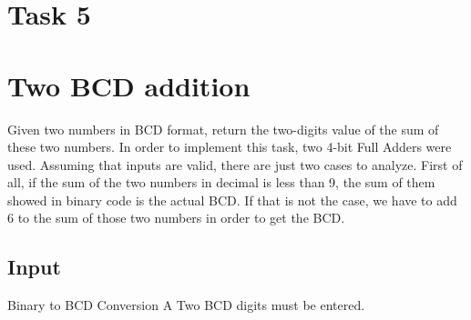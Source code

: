 \newpage


\section*{Task 5}




\section{Two BCD addition}
Given two numbers in BCD format, return the two-digits value of the sum of these two numbers.
In order to implement this task, two 4-bit Full Adders were used.
Assuming that inputs are valid, there are just two cases to analyze. 
First of all, if the sum of the two numbers in decimal is less than 9, the sum of them showed in binary code is the actual BCD.
If that is not the case, we have to add 6 to the sum of those two numbers in order to get the BCD.


\subsection{Input}Binary to BCD Conversion A
Two BCD digits must be entered. 

